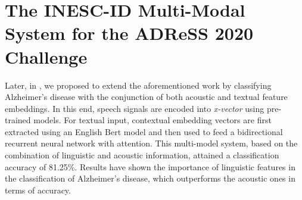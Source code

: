 
\section{The INESC-ID Multi-Modal System for the ADReSS 2020 Challenge}
Later, in \cite{pompili2020inesc}, we proposed to extend the aforementioned work by classifying Alzheimer's disease with the conjunction of both acoustic and textual feature embeddings. In this end, speech signals are encoded into \textit{x-vector} using pre-trained models. For textual input, contextual embedding vectors are first extracted using an English Bert model \cite{Bert} and then used to feed a bidirectional recurrent neural network with attention. This multi-model system, based on the combination of linguistic and acoustic information, attained a classification accuracy of 81.25\%. Results have shown the importance of linguistic features in the classification of Alzheimer’s disease, which outperforms the acoustic ones in terms of accuracy.


